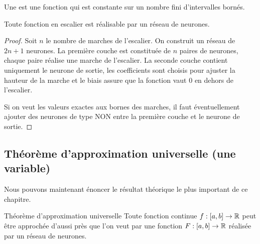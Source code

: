 Une   est une fonction qui est constante sur un nombre fini d'intervalles bornés.




\begin{proposition}{}{}
	Toute fonction en escalier est réalisable par un réseau de neurones.
\end{proposition}

\begin{proof}
	Soit $n$ le nombre de marches de l'escalier.
	On construit un réseau de $2n+1$ neurones. La première couche est constituée de $n$ paires de neurones, chaque paire réalise une marche de l'escalier. La seconde couche contient uniquement le neurone de sortie, les coefficients sont choisis pour ajuster la hauteur de la marche et le biais assure que la fonction vaut $0$ en dehors de l'escalier.
	
	Si on veut les valeurs exactes aux bornes des marches, il faut éventuellement ajouter des neurones de type \og{}NON\fg{} entre la première couche et le neurone de sortie.
\end{proof}

\subsection{Théorème d'approximation universelle (une variable)}


Nous pouvons maintenant énoncer le résultat théorique le plus important de ce chapitre.

\begin{theoreme}{Théorème d'approximation universelle}{}
	Toute fonction continue $f : [a,b] \to \mathbb{R}$ peut être approchée d'aussi près que l'on veut par une fonction $F : [a,b] \to \mathbb{R}$ réalisée par un réseau de neurones.
\end{theoreme}

